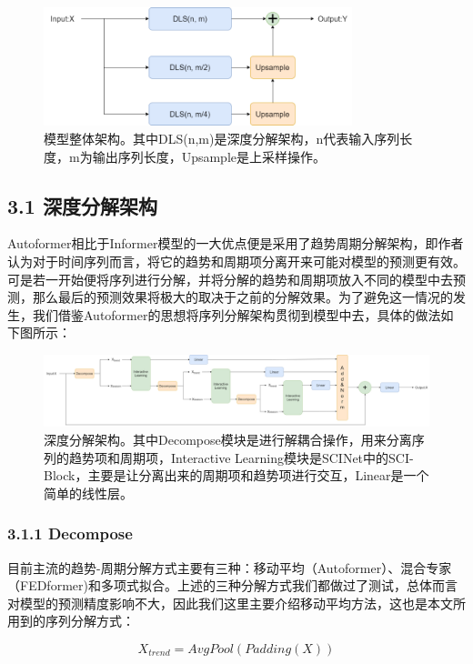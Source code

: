 \documentclass[twoside,a4paper]{article}
\begin{document}
\begin{figure}[H]
\centering 
\includegraphics[width=0.8\textwidth]{model1.png} 
\caption{模型整体架构。其中DLS(n,m)是深度分解架构，n代表输入序列长度，m为输出序列长度，Upsample是上采样操作。}
\end{figure}

\subsection*{3.1 深度分解架构}
Autoformer相比于Informer模型的一大优点便是采用了趋势周期分解架构，即作者认为对于时间序列而言，将它的趋势和周期项分离开来可能对模型的预测更有效。可是若一开始便将序列进行分解，并将分解的趋势和周期项放入不同的模型中去预测，那么最后的预测效果将极大的取决于之前的分解效果。为了避免这一情况的发生，我们借鉴Autoformer的思想将序列分解架构贯彻到模型中去，具体的做法如下图所示：

\begin{figure}[H]
\centering 
\includegraphics[width=1\textwidth]{DLS_internal.png} 
\caption{深度分解架构。其中Decompose模块是进行解耦合操作，用来分离序列的趋势项和周期项，Interactive Learning模块是SCINet中的SCI-Block，主要是让分离出来的周期项和趋势项进行交互，Linear是一个简单的线性层。}
\end{figure}

\subsubsection*{3.1.1 Decompose}
目前主流的趋势-周期分解方式主要有三种：移动平均（Autoformer）、混合专家（FEDformer)和多项式拟合。上述的三种分解方式我们都做过了测试，总体而言对模型的预测精度影响不大，因此我们这里主要介绍移动平均方法，这也是本文所用到的序列分解方式：\par

\begin{equation}
    X_{trend} = AvgPool(Padding(X))
\end{equation}
\end{document}
